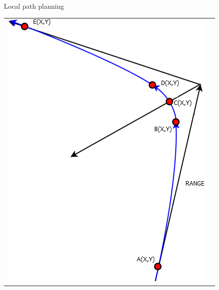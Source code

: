 \begin{frame}{Local path planning}
\begin{tabular}{l l}
\begin{minipage}{0.3\textwidth}
					\includegraphics[width = \textwidth]{control/img/positioning2}
				\end{minipage}
			\end{tabular}
			
		
\end{frame}

